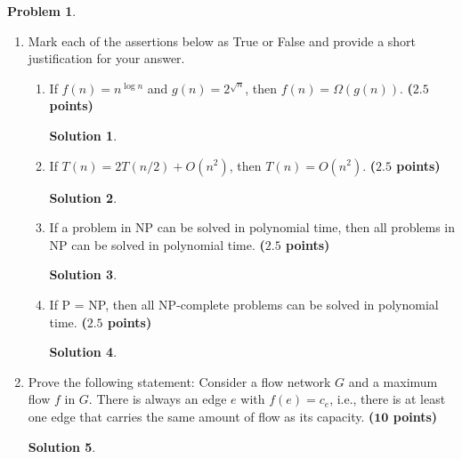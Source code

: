 \documentclass{article}
\theoremstyle{definition}
\newtheorem{problem}{Problem}
\newtheorem*{solution*}{Solution}
\newenvironment{solution}{\begin{solution*}}{{} \end{solution*}}
\newcommand{\grade}[1]{\hfill{\textbf{($\mathbf{#1}$ points)}}}
\begin{document}
\begin{problem}\label{basics} 
~
\begin{enumerate}[label=(\alph*)]
	\item Mark each of the assertions below as True or False and provide a short justification for your answer. 
	
	
	\vspace{2cm}
	
		\begin{enumerate}[label=(\roman*)]
		\item If $f(n) = n^{\log{n}}$ and $g(n) = 2^{\sqrt{n}}$, then $f(n) = \Omega(g(n))$. \grade{2.5}
		
		\medskip
		\begin{solution}
		\end{solution}
		\vfill
		
		\item If $T(n) = 2T(n/2) + O(n^2)$, then $T(n) = O(n^2)$. \grade{2.5}
		
		\medskip
		\begin{solution}
		\end{solution}
		\vfill
		
		\item If a problem in NP can be solved in polynomial time, then all problems in NP can be solved in polynomial time. \grade{2.5}
		
		\medskip
		\begin{solution}
		\end{solution}
		\vfill
				
		\item If P = NP, then all NP-complete problems can be solved in polynomial time. \grade{2.5}

\medskip
		\begin{solution}
		\end{solution}
		
	\end{enumerate} 

	\vfill
	
\newpage
	
\item Prove the following statement: Consider a flow network $G$ and a maximum flow $f$ in $G$. There is always an edge $e$ with $f(e) = c_e$, i.e., there is at least one edge that carries the same amount of flow as its capacity. 
		\grade{10}

\medskip
		\begin{solution}
		\end{solution}
	
\end{enumerate}

\end{problem}
\end{document}
